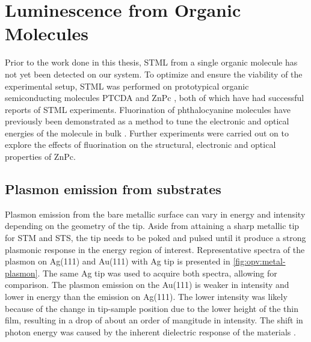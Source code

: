 
\chapter{Luminescence from Organic Molecules}
\label{ch:opv}

Prior to the work done in this thesis, \ac{STML} from a single organic molecule has not yet been detected on our system. To optimize and ensure the viability of the experimental setup, \ac{STML} was performed on prototypical organic semiconducting molecules PTCDA \citep{Rzeznicka2011, Kimura2019} and ZnPc \citep{Zhang2016, Doppagne2017, Zhang2017, Imada2016, Doppagne2018, Miwa2019}, both of which have had successful reports of \ac{STML} experiments. Fluorination of phthalocyanine molecules have previously been demonstrated as a method to tune the electronic and optical energies of the molecule in bulk \citep{schwarze2016band, warren2019controlling}. Further experiments were carried out on  to explore the effects of fluorination on the structural, electronic and optical properties of ZnPc.


\section{Plasmon emission from substrates}

Plasmon emission from the bare metallic surface can vary in energy and intensity depending on the geometry of the tip. Aside from attaining a sharp metallic tip for \ac{STM} and \ac{STS}, the tip needs to be poked and pulsed until it produce a strong plasmonic response in the energy region of interest. Representative spectra of the plasmon on Ag(111) and Au(111) with Ag tip is presented in \autoref{fig:opv:metal-plasmon}. The same Ag tip was used to acquire both spectra, allowing for comparison. The plasmon emission on the Au(111) is weaker in intensity and lower in energy than the emission on Ag(111). The lower intensity was likely because of the change in tip-sample position due to the lower height of the thin film, resulting in a drop of about an order of mangitude in intensity. The shift in photon energy was caused by the inherent dielectric response of the materials \citep{olmon2012optical, yang2015optical}.


